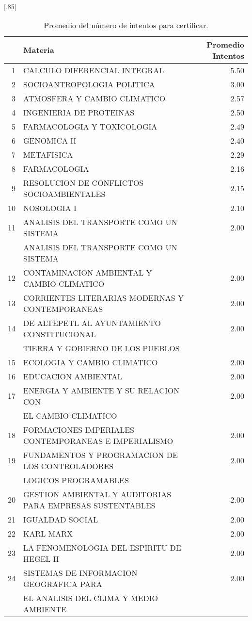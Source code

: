\documentclass[12pt]{article}
\begin{document}
\begin{table}[ht]
\centering
\scalebox{0.75}[.85]{
\begin{tabular}{rlr}
  \hline
 & Materia & Promedio Intentos \\ 
  \hline
1 & CALCULO DIFERENCIAL INTEGRAL & 5.50 \\ 
  2 & SOCIOANTROPOLOGIA POLITICA & 3.00 \\ 
  3 & ATMOSFERA Y CAMBIO CLIMATICO & 2.57 \\ 
  4 & INGENIERIA DE PROTEINAS & 2.50 \\ 
  5 & FARMACOLOGIA Y TOXICOLOGIA & 2.49 \\ 
  6 & GENOMICA II & 2.40 \\ 
  7 & METAFISICA & 2.29 \\ 
  8 & FARMACOLOGIA & 2.16 \\ 
  9 & RESOLUCION DE CONFLICTOS SOCIOAMBIENTALES & 2.15 \\ 
  10 & NOSOLOGIA I & 2.10 \\ 
  11 & ANALISIS DEL TRANSPORTE COMO UN SISTEMA  & 2.00 \\ 
   & ANALISIS DEL TRANSPORTE COMO UN SISTEMA  &  \\ 
  12 & CONTAMINACION AMBIENTAL Y CAMBIO CLIMATICO & 2.00 \\ 
  13 & CORRIENTES LITERARIAS MODERNAS Y CONTEMPORANEAS & 2.00 \\ 
  14 & DE ALTEPETL AL AYUNTAMIENTO CONSTITUCIONAL & 2.00 \\ 
   & TIERRA Y GOBIERNO DE LOS PUEBLOS & \\ 
  15 & ECOLOGIA Y CAMBIO CLIMATICO & 2.00 \\ 
  16 & EDUCACION AMBIENTAL & 2.00 \\ 
  17 & ENERGIA Y AMBIENTE Y SU RELACION CON & 2.00 \\ 
  & EL CAMBIO CLIMATICO &  \\ 
  18 & FORMACIONES IMPERIALES CONTEMPORANEAS E IMPERIALISMO & 2.00 \\ 
  19 & FUNDAMENTOS Y PROGRAMACION DE LOS CONTROLADORES & 2.00 \\ 
  & LOGICOS PROGRAMABLES &  \\ 
  20 & GESTION AMBIENTAL Y AUDITORIAS PARA EMPRESAS SUSTENTABLES & 2.00 \\ 
  21 & IGUALDAD SOCIAL & 2.00 \\ 
  22 & KARL MARX & 2.00 \\ 
  23 & LA FENOMENOLOGIA DEL ESPIRITU DE HEGEL II & 2.00 \\ 
  24 & SISTEMAS DE INFORMACION GEOGRAFICA PARA& 2.00 \\ 
     & EL ANALISIS DEL CLIMA Y MEDIO AMBIENTE & \\ 
   \hline
\end{tabular}
}\caption{\label{Promedio_Intentos_Si_Certificaron} Promedio del n\'umero  de intentos para certificar.}

\end{table}
\end{document}
